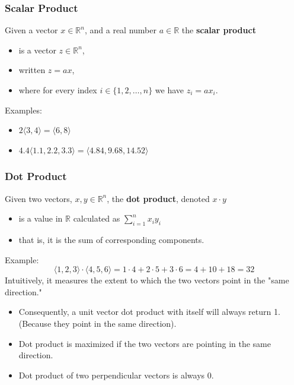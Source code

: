 \documentclass[10pt]{article}
\begin{document}
\subsubsection*{Scalar Product}
Given a vector $x \in \mathbb{R}^n$, and a real number $a \in \mathbb{R}$ the \textbf{scalar product}
\begin{itemize}
	\item is a vector $z \in \mathbb{R}^n$,
	\item written $z = ax$,
	\item where for every index $i \in \{1, 2, \dots, n\}$ we have $z_i = ax_i$.
\end{itemize}
Examples:
\begin{itemize}
	\item $2 \langle 3, 4 \rangle = \langle 6, 8 \rangle$
	\item $4.4 \langle 1.1, 2.2, 3.3 \rangle = \langle 4.84, 9.68, 14.52 \rangle$
\end{itemize}

\subsubsection*{Dot Product}
Given two vectors, $x, y \in \mathbb{R}^n$, the \textbf{dot product}, denoted $x \cdot y$ 
\begin{itemize}
	\item is a value in $\mathbb{R}$ calculated as $\sum_{i = 1}^n x_i y_i$
	\item that is, it is the sum of corresponding components.
\end{itemize}
Example:
\[\langle 1, 2, 3 \rangle \cdot \langle 4, 5, 6 \rangle = 1 \cdot 4 + 2 \cdot 5 + 3 \cdot 6 = 4 + 10 + 18 = 32\]
Intuitively, it measures the extent to which the two vectors point in the "same direction."
\begin{itemize}
	\item Consequently, a unit vector dot product with itself will always return 1.  (Because they point in the same direction).
	\item Dot product is maximized if the two vectors are pointing in the same direction.
	\item Dot product of two perpendicular vectors is always 0.
\end{itemize}
\end{document}
